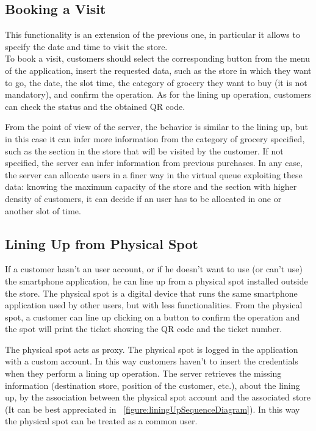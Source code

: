 \subsection{Booking a Visit}
This functionality is an extension of the previous one, in particular it allows to specify the date and time to visit the store.\\
To book a visit, customers should select the corresponding button from the menu of the application, insert the requested data, such as the store in which they want to go, the date, the slot time, the category of grocery they want to buy (it is not mandatory), and confirm the operation.
As for the lining up operation, customers can check the status and the obtained QR code.

From the point of view of the server, the behavior is similar to the lining up, but in this case it can infer more information from the category of grocery specified, such as the section in the store that will be visited by the customer. If not specified, the server can infer information from previous purchases.
In any case, the server can allocate users in a finer way in the virtual queue exploiting these data: knowing the maximum capacity of the store and the section with higher density of customers, it can decide if an user has to be allocated in one or another slot of time.

\subsection{Lining Up from Physical Spot}
If a customer hasn't an user account, or if he doesn't want to use (or can't use) the smartphone application, he can line up from a physical spot installed outside the store.
The physical spot is a digital device that runs the same smartphone application used by other users, but with less functionalities.
From the physical spot, a customer can line up clicking on a button to confirm the operation and the spot will print the ticket showing the QR code and the ticket number.

The physical spot acts as proxy. The physical spot is logged in the application with a custom account. In this way customers haven't to insert the credentials when they perform a lining up operation.
The server retrieves the missing information (destination store, position of the customer, etc.), about the lining up, by the association between the physical spot account and the associated store (It can be best appreciated in ~\ref{figure:liningUpSequenceDiagram}).
In this way the physical spot can be treated as a common user.

